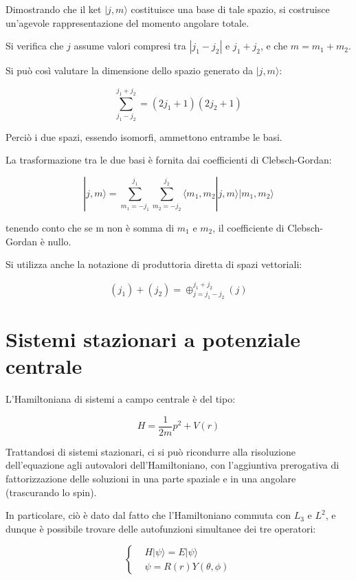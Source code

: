 \documentclass{article}
\begin{document}
Dimostrando che il ket $|j,m\rangle $ costituisce una base di tale spazio, si costruisce un'agevole rappresentazione del momento angolare totale.

Si verifica che $j$ assume valori compresi tra $|j_1-j_2|$ e $j_1+j_2$, e che $m=m_1+m_2$.

Si può così valutare la dimensione dello spazio generato da $|j,m\rangle $:

\begin{equation}
  \sum_{j_1-j_2}^{j_1+j_2}=(2j_1+1)(2j_2+1)
\end{equation}

Perciò i due spazi, essendo isomorfi, ammettono entrambe le basi.

La trasformazione tra le due basi è fornita dai coefficienti di Clebsch-Gordan:

\begin{equation}
  |j,m\rangle =\sum_{m_1=-j_1}^{j_1} \sum_{m_2=-j_2}^{j_2}\langle m_1,m_2|j,m\rangle |m_1,m_2\rangle
\end{equation}

tenendo conto che se m non è somma di $m_1$ e $m_2$, il coefficiente di Clebsch-Gordan è nullo.

Si utilizza anche la notazione di produttoria diretta di spazi vettoriali:

\begin{equation}
  (j_1)+(j_2)= \oplus_{j=j_1-j_2}^{j_1+j_2} (j)
\end{equation}

\section{Sistemi stazionari a potenziale centrale}
L'Hamiltoniana di sistemi a campo centrale è del tipo:

\begin{equation}
  H=\frac{1}{2m}p^2+V(r)
\end{equation}

Trattandosi di sistemi stazionari, ci si può ricondurre alla risoluzione dell'equazione agli autovalori dell'Hamiltoniano,
con l'aggiuntiva prerogativa di fattorizzazione delle soluzioni in una parte spaziale e in una angolare (trascurando lo spin).

In particolare, ciò è dato dal fatto che l'Hamiltoniano commuta con $L_3$ e $L^2$, e dunque è possibile trovare delle autofunzioni simultanee dei tre operatori:

\begin{equation}
  \left\{
  \begin{aligned}
     & H|\psi\rangle =E|\psi\rangle \\
     & \psi= R(r)Y(\theta, \phi)
  \end{aligned}
  \right.
\end{equation}
\end{document}
